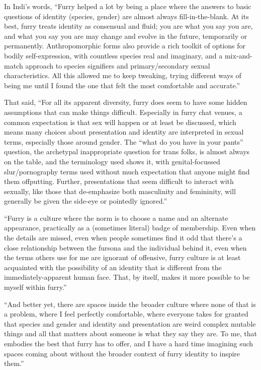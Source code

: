 In Indi's words, ``Furry helped a lot by being a place where the answers to basic questions of identity (species, gender) are almost always fill-in-the-blank. At its best, furry treats identity as consensual and fluid; you are what you say you are, and what you say you are may change and evolve in the future, temporarily or permanently. Anthropomorphic forms also provide a rich toolkit of options for bodily self-expression, with countless species real and imaginary, and a mix-and-match approach to species signifiers and primary/secondary sexual characteristics. All this allowed me to keep tweaking, trying different ways of being me until I found the one that felt the most comfortable and accurate.''

That said, ``For all its apparent diversity, furry does seem to have some hidden assumptions that can make things difficult. Especially in furry chat venues, a common expectation is that sex will happen or at least be discussed, which means many choices about presentation and identity are interpreted in sexual terms, especially those around gender. The ``what do you have in your pants'' question, the archetypal inappropriate question for trans folks, is almost always on the table, and the terminology used shows it, with genital-focussed slur/pornography terms used without much expectation that anyone might find them offputting. Further, presentations that seem difficult to interact with sexually, like those that de-emphasize both masculinity and femininity, will generally be given the side-eye or pointedly ignored.''


``Furry is a culture where the norm is to choose a name and an alternate appearance, practically as a (sometimes literal) badge of membership. Even when the details are missed, even when people sometimes find it odd that there's a close relationship between the fursona and the individual behind it, even when the terms others use for me are ignorant of offensive, furry culture is at least acquainted with the possibility of an identity that is different from the immediately-apparent human face. That, by itself, makes it more possible to be myself within furry.''

``And better yet, there are spaces inside the broader culture where none of that is a problem, where I feel perfectly comfortable, where everyone takes for granted that species and gender and identity and presentation are weird complex mutable things and all that matters about someone is what they say they are. To me, that embodies the best that furry has to offer, and I have a hard time imagining such spaces coming about without the broader context of furry identity to inspire them.''

